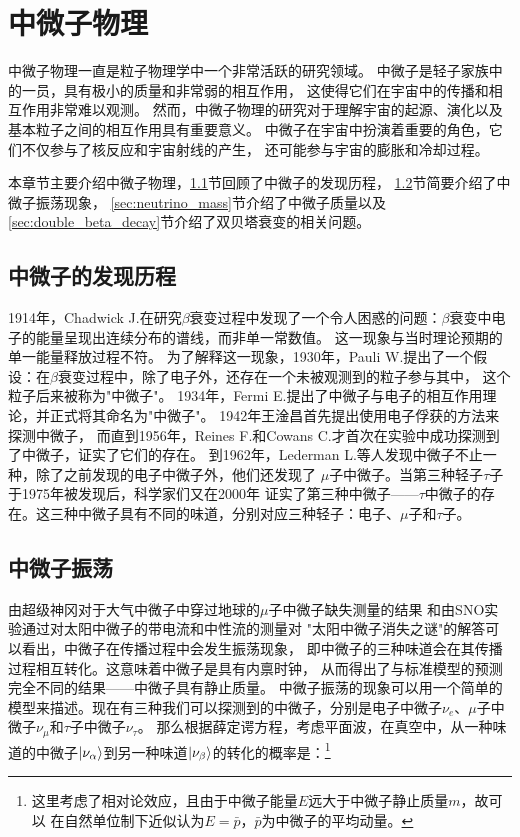 \chapter{中微子物理}

中微子物理一直是粒子物理学中一个非常活跃的研究领域。
中微子是轻子家族中的一员，具有极小的质量和非常弱的相互作用，
这使得它们在宇宙中的传播和相互作用非常难以观测。
然而，中微子物理的研究对于理解宇宙的起源、演化以及基本粒子之间的相互作用具有重要意义。
中微子在宇宙中扮演着重要的角色，它们不仅参与了核反应和宇宙射线的产生，
还可能参与宇宙的膨胀和冷却过程。

本章节主要介绍中微子物理，\ref{sec:neutrino_discovery}节回顾了中微子的发现历程，
\ref{sec:neutrino_oscillation}节简要介绍了中微子振荡现象，
\ref{sec:neutrino_mass}节介绍了中微子质量以及
\ref{sec:double_beta_decay}节介绍了双贝塔衰变的相关问题。

\section{中微子的发现历程}\label{sec:neutrino_discovery}

1914年，Chadwick J.在研究$\beta$衰变过程中发现了一个令人困惑的问题：$\beta$衰变中电子的能量呈现出连续分布的谱线，而非单一常数值。
这一现象与当时理论预期的单一能量释放过程不符。
为了解释这一现象，1930年，Pauli W.提出了一个假设：在$\beta$衰变过程中，除了电子外，还存在一个未被观测到的粒子参与其中，
这个粒子后来被称为"中微子"。
1934年，Fermi E.提出了中微子与电子的相互作用理论，并正式将其命名为"中微子"。
1942年王淦昌首先提出使用电子俘获的方法来探测中微子，
而直到1956年，Reines F.和Cowans C.才首次在实验中成功探测到了中微子，证实了它们的存在。\cite{science.124.3212.103}
到1962年，Lederman L.等人发现中微子不止一种，除了之前发现的电子中微子外，他们还发现了
$\mu$子中微子。当第三种轻子$\tau$子于1975年被发现后，科学家们又在2000年
证实了第三种中微子——$\tau$中微子的存在。这三种中微子具有不同的味道，分别对应三种轻子：电子、$\mu$子和$\tau$子。

\section{中微子振荡}\label{sec:neutrino_oscillation}

由超级神冈对于大气中微子中穿过地球的$\mu$子中微子缺失测量的结果
和由SNO实验通过对太阳中微子的带电流和中性流的测量对
"太阳中微子消失之谜"的解答可以看出，中微子在传播过程中会发生振荡现象，
即中微子的三种味道会在其传播过程相互转化。这意味着中微子是具有内禀时钟，
从而得出了与标准模型的预测完全不同的结果——中微子具有静止质量。
中微子振荡的现象可以用一个简单的模型来描述。现在有三种我们可以探测到的中微子，分别是电子中微子$\nu_e$、$\mu$子中微子$\nu_\mu$和$\tau$子中微子$\nu_\tau$。
那么根据薛定谔方程，考虑平面波，在真空中，从一种味道的中微子$\ket{\nu_\alpha}$到另一种味道$\ket{\nu_\beta}$的转化的概率是：\footnote{这里考虑了相对论效应，且由于中微子能量$E$远大于中微子静止质量$m$，故可以
在自然单位制下近似认为$E=\bar{p}$，$\bar{p}$为中微子的平均动量。}

